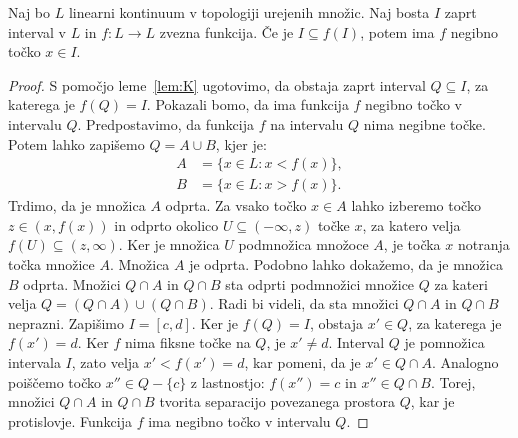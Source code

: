 \documentclass[../TG_magistrsko_delo_sections.tex]{subfiles}
\begin{document}
\begin{lema}
Naj bo $L$ linearni kontinuum v topologiji urejenih množic. Naj bosta $I$ zaprt interval v $L$ in $f:L \to L$ zvezna funkcija. Če je $I \subseteq f(I)$, potem ima $f$ negibno točko $x \in I$.
\end{lema}
\begin{proof}
S pomočjo leme~\ref{lem:K} ugotovimo, da obstaja zaprt interval $Q \subseteq I$, za katerega je $f(Q) = I$. Pokazali bomo, da ima funkcija $f$ negibno točko v intervalu $Q$. Predpostavimo, da funkcija $f$ na intervalu $Q$ nima negibne točke. Potem lahko zapišemo $Q = A \cup B$, kjer je:
\begin{equation*} %
\begin{split}
A &= \{x \in L : x < f(x)\}, \\ 
B &= \{x \in L : x > f(x)\}.
\end{split}
\end{equation*}
Trdimo, da je množica $A$ odprta. Za vsako točko $x \in A$ lahko izberemo točko $z \in (x, f(x))$ in odprto okolico $U \subseteq  (-\infty, z)$ točke $x$, za katero velja $f(U) \subseteq (z, \infty)$. Ker je množica $U$ podmnožica množoce $A$, je točka $x$ notranja točka množice $A$. Množica $A$ je odprta. Podobno lahko dokažemo, da je množica $B$ odprta. Množici $Q \cap A$ in $Q \cap B$ sta odprti podmnožici množice $Q$ za kateri velja $Q = (Q \cap A) \cup (Q \cap B)$. Radi bi videli, da sta množici $Q \cap A$ in $Q \cap B$ neprazni. Zapišimo $I = [c, d]$. Ker je $f(Q) = I$, obstaja $x' \in Q$, za katerega je $f(x') =d$. Ker $f$ nima fiksne točke na $Q$, je $x' \neq d$. Interval $Q$ je pomnožica intervala $I$, zato velja $x' < f(x') = d$, kar pomeni, da je $x' \in Q \cap A$. Analogno poiščemo točko $x'' \in Q - \{c\}$ z lastnostjo: $f(x'') = c$ in $x'' \in Q \cap B$. Torej, množici $Q \cap A$ in $Q \cap B$ tvorita separacijo povezanega prostora $Q$, kar je protislovje. Funkcija $f$ ima negibno točko v intervalu $Q$.
\end{proof}
\end{document}
